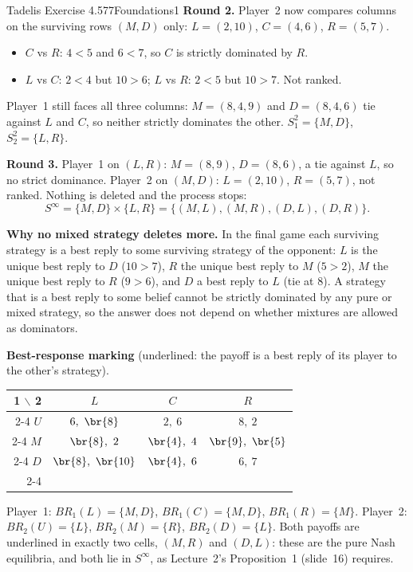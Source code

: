 \begin{exsol}{Tadelis Exercise 4.5}{77}{Foundations}{1}
\textbf{Round 2.} Player~2 now compares columns on the surviving rows $(M, D)$ only:
$L = (2, 10)$, $C = (4, 6)$, $R = (5, 7)$.
\begin{itemize}
  \item $C$ vs $R$: $4 < 5$ and $6 < 7$, so $C$ is strictly dominated by $R$.
  \item $L$ vs $C$: $2 < 4$ but $10 > 6$; $L$ vs $R$: $2 < 5$ but $10 > 7$. Not ranked.
\end{itemize}
Player~1 still faces all three columns: $M = (8,4,9)$ and $D = (8,4,6)$ tie against $L$ and $C$,
so neither strictly dominates the other. $S_1^2 = \{M, D\}$, $S_2^2 = \{L, R\}$.

\textbf{Round 3.} Player~1 on $(L, R)$: $M = (8, 9)$, $D = (8, 6)$, a tie against $L$, so no
strict dominance. Player~2 on $(M, D)$: $L = (2, 10)$, $R = (5, 7)$, not ranked. Nothing is
deleted and the process stops:
\[
  S^\infty = \{M, D\} \times \{L, R\} = \{(M,L), (M,R), (D,L), (D,R)\}.
\]

\textbf{Why no mixed strategy deletes more.} In the final game each surviving strategy is a best
reply to some surviving strategy of the opponent: $L$ is the unique best reply to $D$
($10 > 7$), $R$ the unique best reply to $M$ ($5 > 2$), $M$ the unique best reply to $R$
($9 > 6$), and $D$ a best reply to $L$ (tie at 8). A strategy that is a best reply to some
belief cannot be strictly dominated by any pure or mixed strategy, so the answer does not depend
on whether mixtures are allowed as dominators.

\textbf{Best-response marking} (underlined: the payoff is a best reply of its player to the
other's strategy).
\begin{center}
\begin{tabular}{r|c|c|c|}
\multicolumn{1}{r}{1 $\backslash$ 2} & \multicolumn{1}{c}{$L$} & \multicolumn{1}{c}{$C$} & \multicolumn{1}{c}{$R$}\\ \cline{2-4}
$U$ & $6,\ \br{8}$ & $2,\ 6$ & $8,\ 2$ \\ \cline{2-4}
$M$ & $\br{8},\ 2$ & $\br{4},\ 4$ & $\br{9},\ \br{5}$ \\ \cline{2-4}
$D$ & $\br{8},\ \br{10}$ & $\br{4},\ 6$ & $6,\ 7$ \\ \cline{2-4}
\end{tabular}
\end{center}
Player~1: $BR_1(L) = \{M, D\}$, $BR_1(C) = \{M, D\}$, $BR_1(R) = \{M\}$. Player~2:
$BR_2(U) = \{L\}$, $BR_2(M) = \{R\}$, $BR_2(D) = \{L\}$. Both payoffs are underlined in exactly
two cells, $(M,R)$ and $(D,L)$: these are the pure Nash equilibria, and both lie in $S^\infty$,
as Lecture~2's Proposition~1 (slide~16) requires.


\end{exsol}

